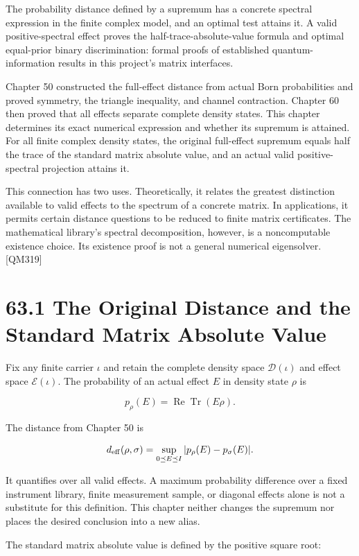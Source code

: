 \documentclass[
  11pt,
  oneside]{book}
\begin{document}
The probability distance defined by a supremum has a concrete spectral
expression in the finite complex model, and an optimal test attains it.
A valid positive-spectral effect proves the half-trace-absolute-value
formula and optimal equal-prior binary discrimination: formal proofs of
established quantum-information results in this project's matrix
interfaces.

Chapter 50 constructed the full-effect distance from actual Born
probabilities and proved symmetry, the triangle inequality, and channel
contraction. Chapter 60 then proved that all effects separate complete
density states. This chapter determines its exact numerical expression
and whether its supremum is attained. For all finite complex density
states, the original full-effect supremum equals half the trace of the
standard matrix absolute value, and an actual valid positive-spectral
projection attains it.

This connection has two uses. Theoretically, it relates the greatest
distinction available to valid effects to the spectrum of a concrete
matrix. In applications, it permits certain distance questions to be
reduced to finite matrix certificates. The mathematical library's
spectral decomposition, however, is a noncomputable existence choice.
Its existence proof is not a general numerical eigensolver. {[}QM319{]}

\section{63.1 The Original Distance and the Standard Matrix Absolute
Value}

Fix any finite carrier \(\iota\) and retain the complete density space
\(\mathcal D(\iota)\) and effect space \(\mathcal E(\iota)\). The
probability of an actual effect \(E\) in density state \(\rho\) is

\[
p_\rho(E)=\operatorname{Re}\operatorname{Tr}(E\rho).
\]

The distance from Chapter 50 is

\[
d_{\rm eff}(\rho,\sigma)
=\sup_{0\preceq E\preceq I}|p_\rho(E)-p_\sigma(E)|.
\]

It quantifies over all valid effects. A maximum probability difference
over a fixed instrument library, finite measurement sample, or diagonal
effects alone is not a substitute for this definition. This chapter
neither changes the supremum nor places the desired conclusion into a
new alias.

The standard matrix absolute value is defined by the positive square
root:
\end{document}
